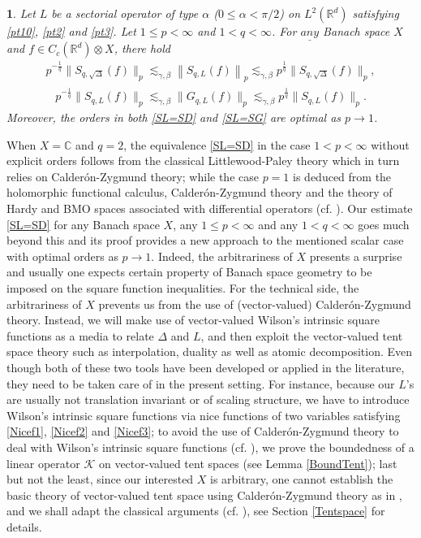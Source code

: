 \documentclass[oneside,english,a4wide]{amsart}
\numberwithin{equation}{section}
\numberwithin{figure}{section}
\theoremstyle{plain}
\newtheorem{thm}{\protect\theoremname}[section]
\theoremstyle{plain}
\theoremstyle{definition}
\theoremstyle{plain}
\theoremstyle{remark}
\theoremstyle{definition}
\theoremstyle{remark}
\theoremstyle{definition}
\providecommand{\theoremname}{Theorem}
\newcommand{\real}{{\mathbb R}}
\newcommand{\8}{+\infty}
\renewcommand{\1}{\mathbbm{1}}
\newcommand\norm[1]{ \left\| #1 \right\| }
\begin{document}
\begin{thm}\label{main2}
Let $L$ be a sectorial operator of type $\alpha$ ($0 \leq \alpha < \pi/2$) on $L^2(\real^d)$ satisfying \eqref{pt10}, \eqref{pt2} and \eqref{pt3}. Let $1 \leq p < \infty$ and $1 < q < \infty$. For ${\underline {any}}$ Banach space $X$ and $f\in C_c(\mathbb R^d)\otimes X$, there hold
\begin{align}\label{SL=SD}
    p^{-\frac{1}{q}}\| S_{q,{\sqrt{\Delta}}}(f) \|_p \lesssim_{\gamma, \beta} \norm{ S_{q,L}(f) }_p \lesssim_{\gamma, \beta} p^{\frac{1}{q}}\| S_{q,{\sqrt{\Delta}}}(f) \|_p, 
    \end{align}
        \begin{align}\label{SL=SG}
    p^{-\frac{1}{q}}\| S_{q,L}(f) \|_p \lesssim_{\gamma, \beta} \| G_{q,L}(f) \|_p \lesssim_{\gamma, \beta} p^{\frac{1}{q}}\| S_{q,L}(f) \|_p. 
\end{align}
{Moreover, the orders in both \eqref{SL=SD} and \eqref{SL=SG} are {\rm optimal} as $p\rightarrow1$.}
\end{thm}

When $X=\mathbb C$ and $q=2$, the equivalence \eqref{SL=SD} in the case $1<p<\infty$ without explicit orders follows from the classical Littlewood-Paley theory which in turn relies on Calder\'on-Zygmund theory; while the case $p=1$ is deduced from the holomorphic functional calculus, Calder\'on-Zygmund theory and the theory of Hardy and BMO spaces associated with differential operators (cf. \cite[Theorem 6.10]{DXT}). Our estimate \eqref{SL=SD} for any Banach space $X$, any $1 \leq p < \infty$ and any $1 < q < \infty$  goes much beyond this and its proof provides a new approach to the mentioned scalar case with optimal orders as $p\rightarrow1$. Indeed, the arbitrariness of $X$ presents a surprise and usually one expects certain property of Banach space geometry to be imposed on the square function inequalities. For the technical side, the arbitrariness of $X$ prevents us from the use of (vector-valued) Calder\'on-Zygmund theory. Instead, we will make use of vector-valued Wilson's intrinsic square functions as a media to relate $\Delta$ and $L$, and then exploit the vector-valued tent space theory such as interpolation, duality as well as atomic decomposition. Even though both of these two tools have been developed or applied in the literature, they need to be taken care of in the present setting. For instance, because our $L$'s are usually not translation invariant or of scaling structure, we have to introduce Wilson's intrinsic square functions via nice functions of two variables satisfying \eqref{Nicef1}, \eqref{Nicef2} and \eqref{Nicef3}; to avoid the use of Calder\'on-Zygmund theory to deal with Wilson's intrinsic square functions (cf. \cite{Wilson2007,Xu2022}), we prove the boundedness of a linear operator $\mathcal K$ on vector-valued tent spaces (see Lemma \ref{BoundTent}); last but not the least, since our interested $X$ is arbitrary, one cannot  establish the basic theory of vector-valued tent space using Calder\'on-Zygmund theory as in \cite{Hytonen2008, Kemppainen2014,Kemppainen2016, Harboure1991}, and we shall adapt {the classical arguments} (cf. \cite{Coifman1985}), see Section \ref{Tentspace} for details. 
\end{document}
